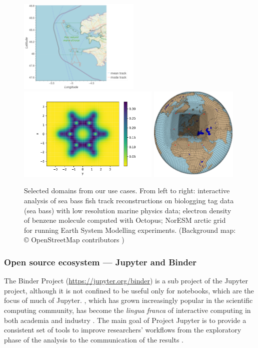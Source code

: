 \begin{figure}
  \includegraphics[height=4.5cm]{images/fish.png}\hfill
  \includegraphics[height=4.5cm]{images/octopus-benzene.pdf}\hfill\hspace{0.5cm}
  \includegraphics[height=4.5cm]{images/gg-a.png}
  \caption{Selected domains from our use cases. From left to right: interactive
    analysis of sea bass fish track reconstructions on biologging tag data (sea bass)
    with low resolution marine physics data; electron
    density of benzene molecule computed with Octopus; NorESM arctic grid for running Earth System Modelling experiments.
    (Background map: \copyright
    OpenStreetMap contributors ) \label{fig:applications}}
\end{figure}

\subsubsection{Open source ecosystem --- Jupyter and Binder}\label{sec:opensource}

The Binder Project \cite{binder} (\url{https://jupyter.org/binder}) is
a sub project of the Jupyter project, although it is not confined to be
useful only for notebooks, which are the focus of much of Jupyter.
 \cite{Jupyter}, which has grown increasingly popular in the scientific
computing community, has become the \emph{lingua franca} of interactive
computing in both academia and industry \cite{Perkel2018}. The main goal of Project Jupyter
is to provide a consistent set of tools to improve researchers'
workflows from the exploratory phase of the analysis to the communication
of the results \cite{Kluyver2016,Granger2021}.

